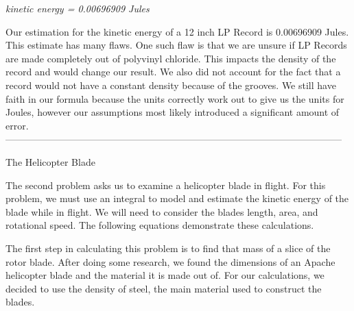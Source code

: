 \documentclass[a4paper, 11pt, oneside]{book} %
\begin{document}
\textit{kinetic energy = 0.00696909 Jules }\\

\vspace{0.5\baselineskip} %
\vspace{0.5\baselineskip} %

Our estimation for the kinetic energy of a 12 inch LP Record is 0.00696909 Jules. This estimate
has many flaws. One such flaw is that we are unsure if LP Records are made completely out of polyvinyl chloride. This impacts the density of the record and would change our result. We also did not account for the fact that a record would not have a constant density because of the grooves. We still have faith in our formula because the units correctly work out to give us the units for Joules, however our assumptions most likely introduced a significant amount of error. \\

\vspace{0.5\baselineskip} %
\vspace{0.5\baselineskip} %
---------------------------------------------------------------------------------------------------------
\vspace{0.5\baselineskip} %
\vspace{0.5\baselineskip} %

{\LARGE The Helicopter Blade \\} %
\vspace{0.5\baselineskip} %
\vspace{0.5\baselineskip} %

The second problem asks us to examine a helicopter blade in flight. For this problem, we must use an integral to model and estimate the kinetic energy of the blade while in flight. We will need to consider the blades length, area, and rotational speed. The following equations demonstrate these calculations. \\

\vspace{0.5\baselineskip} %
\vspace{0.5\baselineskip} %

The first step in calculating this problem is to find that mass of a slice of the rotor blade. After doing some research, we found the dimensions of an Apache helicopter blade and the material it is made out of. For our calculations, we decided to use the density of steel, the main material used to construct the blades.\\ 
\end{document}
